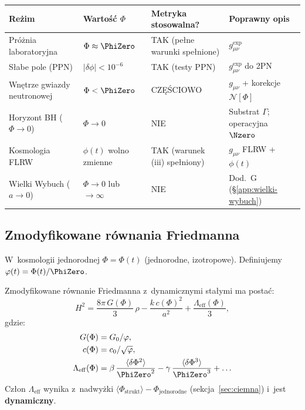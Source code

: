 \begin{center}
\small
\begin{tabular}{@{}p{3.5cm}p{3.0cm}p{3.5cm}p{3.5cm}@{}}
\toprule
\textbf{Re\.zim} & \textbf{Warto\'s\'c $\Phi$}
  & \textbf{Metryka stosowalna?} & \textbf{Poprawny opis} \\
\midrule
Pr\'o\.znia laboratoryjna
  & $\Phi \approx \PhiZero$
  & TAK (pe\l{}ne warunki spe\l{}nione)
  & $g_{\mu\nu}^{\mathrm{exp}}$ \\
\midrule
S\l{}abe pole (PPN)
  & $|\delta\phi| < 10^{-6}$
  & TAK (testy PPN)
  & $g_{\mu\nu}^{\mathrm{exp}}$ do 2PN \\
\midrule
Wnętrze gwiazdy neutronowej
  & $\Phi < \PhiZero$
  & CZ\k{E}\'SCIOWO
  & $g_{\mu\nu}$ + korekcje $\mathcal{N}[\Phi]$ \\
\midrule
Horyzont BH ($\Phi \to 0$)
  & $\Phi \to 0$
  & NIE
  & Substrat $\Gamma$; operacyjna $\Nzero$ \\
\midrule
Kosmologia FLRW
  & $\phi(t)$ wolno zmienne
  & TAK (warunek (iii) spe\l{}niony)
  & $g_{\mu\nu}$ FLRW + $\phi(t)$ \\
\midrule
Wielki Wybuch ($a \to 0$)
  & $\Phi \to 0$ lub $\to\infty$
  & NIE
  & Dod.~G (\S\ref{app:wielki-wybuch}) \\
\bottomrule
\end{tabular}
\end{center}

\subsection{Zmodyfikowane r\'ownania Friedmanna}\label{ssec:friedmann}

W~kosmologii jednorodnej $\Phi = \Phi(t)$ (jednorodne,
izotropowe). Definiujemy $\varphi(t) = \Phi(t)/\PhiZero$.

\begin{proposition}\label{prop:cosmo}\label{thm:friedmann}
Zmodyfikowane r\'ownanie Friedmanna z~dynamicznymi sta\l{}ymi ma
posta\'c:
\begin{equation}\label{eq:friedmann-TGP}
  H^2 = \frac{8\pi\,G(\Phi)}{3}\,\rho
       - \frac{k\,c(\Phi)^2}{a^2}
       + \frac{\Lambda_{\mathrm{eff}}(\Phi)}{3},
\end{equation}
gdzie:
\begin{align}
  G(\Phi) &= G_0/\varphi, \\
  c(\Phi) &= c_0/\sqrt{\varphi}, \\
  \Lambda_{\mathrm{eff}}(\Phi)
    &= \beta\,\frac{\langle\delta\Phi^2\rangle}{\PhiZero^2}
     - \gamma\,\frac{\langle\delta\Phi^3\rangle}{\PhiZero^3}
     + \ldots
\end{align}
Cz\l{}on $\Lambda_{\mathrm{eff}}$ wynika z~nadwy\.zki
$\langle\Phi_{\mathrm{strukt}}\rangle - \Phi_{\mathrm{jednorodne}}$
(sekcja~\ref{sec:ciemna}) i~jest \textbf{dynamiczny}.
\end{proposition}

